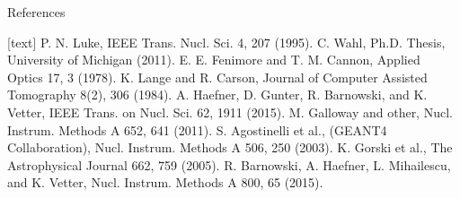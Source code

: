 \documentclass[xcolor=x11names,compress]{beamer}
\renewcommand{\(}{\begin{columns}}
\renewcommand{\)}{\end{columns}}
\newcommand{\<}[1]{\begin{column}{#1}}
\renewcommand{\>}{\end{column}}
\begin{document}
\begin{frame}{References}    
\vspace{-14ex}
\tiny
  \begin{thebibliography}{10}    
  [text]
    P. N. Luke, IEEE Trans. Nucl. Sci. 4, 207 (1995).
   C. Wahl, Ph.D. Thesis, University of Michigan (2011).
   E. E. Fenimore and T. M. Cannon, Applied Optics 17, 3 (1978).
   K. Lange and R. Carson, Journal of Computer Assisted Tomography 8(2), 306 (1984).
   A. Haefner, D. Gunter, R. Barnowski, and K. Vetter, IEEE Trans. on Nucl. Sci. 62, 1911 (2015).
    M. Galloway and other, Nucl. Instrum. Methods A 652, 641 (2011).
   S. Agostinelli et al., (GEANT4 Collaboration), Nucl. Instrum. Methods A 506, 250 (2003).
   K. Gorski et al., The Astrophysical Journal 662, 759 (2005).
   R. Barnowski, A. Haefner, L. Mihailescu, and K. Vetter, Nucl. Instrum. Methods A 800, 65 (2015).
  \end{thebibliography}
\end{frame}
\end{document}
